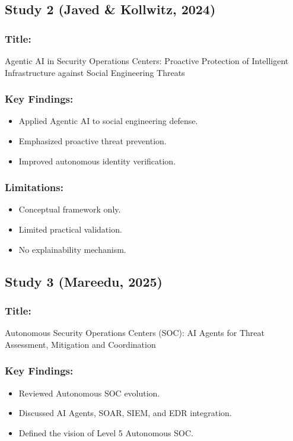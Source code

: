 \documentclass[12pt,a4paper]{report}
\begin{document}
\subsection{Study 2 (Javed \& Kollwitz, 2024)}

\subsubsection*{Title:}
Agentic AI in Security Operations Centers: Proactive Protection of Intelligent Infrastructure against Social Engineering Threats

\subsubsection*{Key Findings:}
\begin{itemize}
    \item Applied Agentic AI to social engineering defense.
    \item Emphasized proactive threat prevention.
    \item Improved autonomous identity verification.
\end{itemize}

\subsubsection*{Limitations:}
\begin{itemize}
    \item Conceptual framework only.
    \item Limited practical validation.
    \item No explainability mechanism.
\end{itemize}

\subsection{Study 3 (Mareedu, 2025)}

\subsubsection*{Title:}
Autonomous Security Operations Centers (SOC): AI Agents for Threat Assessment, Mitigation and Coordination

\subsubsection*{Key Findings:}
\begin{itemize}
    \item Reviewed Autonomous SOC evolution.
    \item Discussed AI Agents, SOAR, SIEM, and EDR integration.
    \item Defined the vision of Level 5 Autonomous SOC.
\end{itemize}
\end{document}

